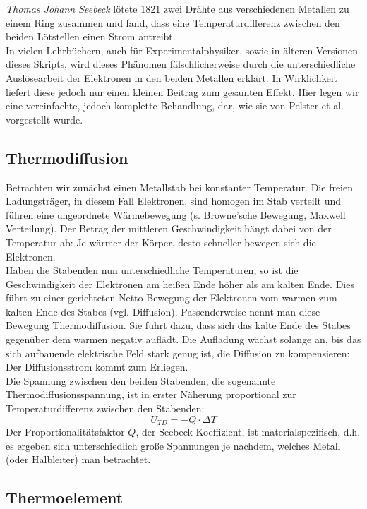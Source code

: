 \textit{Thomas Johann Seebeck} lötete 1821 zwei Drähte aus verschiedenen Metallen zu einem Ring zusammen und fand, dass eine Temperaturdifferenz zwischen den beiden Lötstellen einen Strom antreibt.\\
In vielen Lehrbüchern, auch für Experimentalphysiker, sowie in älteren Versionen dieses Skripts, wird dieses Phänomen fälschlicherweise durch die unterschiedliche Auslösearbeit der Elektronen in den beiden Metallen erklärt. In Wirklichkeit liefert diese jedoch nur einen kleinen Beitrag zum gesamten Effekt. Hier legen wir eine vereinfachte, jedoch komplette Behandlung, dar, wie sie von Pelster et al. vorgestellt wurde.

\subsection{Thermodiffusion}

Betrachten wir zunächst einen Metallstab bei konstanter Temperatur. Die freien Ladungsträger, in diesem Fall Elektronen, sind homogen im Stab verteilt und führen eine ungeordnete Wärmebewegung (s. Browne'sche Bewegung, Maxwell Verteilung). Der Betrag der mittleren Geschwindigkeit hängt dabei von der Temperatur ab: Je wärmer der Körper, desto schneller bewegen sich die Elektronen.\\
Haben die Stabenden nun unterschiedliche Temperaturen, so ist die Geschwindigkeit der Elektronen am heißen Ende höher als am kalten Ende. Dies führt zu einer gerichteten Netto-Bewegung der Elektronen vom warmen zum kalten Ende des Stabes (vgl. Diffusion). Passenderweise nennt man diese Bewegung Thermodiffusion. Sie führt dazu, dass sich das kalte Ende des Stabes gegenüber dem warmen negativ auflädt. Die Aufladung wächst solange an, bis das sich aufbauende elektrische Feld stark genug ist, die Diffusion zu kompensieren: Der Diffusionsstrom kommt zum Erliegen.\\
Die Spannung zwischen den beiden Stabenden, die sogenannte Thermodiffusionsspannung, ist in erster Näherung proportional zur Temperaturdifferenz zwischen den Stabenden:
\begin{equation}
	U_{TD} = -Q\cdot \Delta T
\end{equation}
Der Proportionalitätsfaktor $Q$, der Seebeck-Koeffizient, ist materialspezifisch, d.h. es ergeben sich unterschiedlich große Spannungen je nachdem, welches Metall (oder Halbleiter) man betrachtet.

\subsection{Thermoelement}


